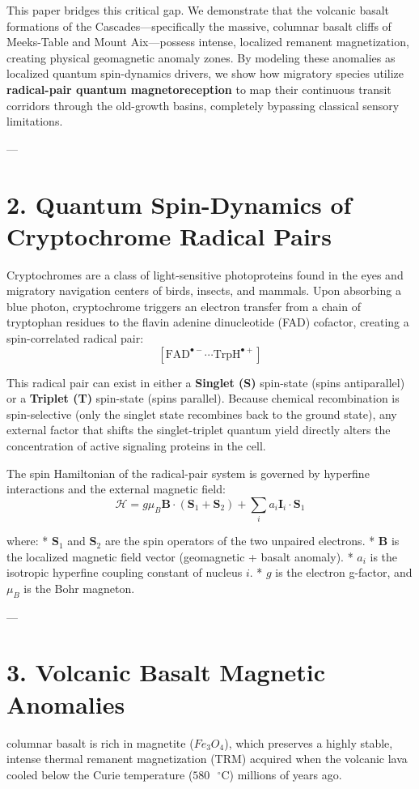 \documentclass[11pt,twocolumn]{article}
\begin{document}
This paper bridges this critical gap. We demonstrate that the volcanic basalt formations of the Cascades—specifically the massive, columnar basalt cliffs of Meeks-Table and Mount Aix—possess intense, localized remanent magnetization, creating physical geomagnetic anomaly zones. By modeling these anomalies as localized quantum spin-dynamics drivers, we show how migratory species utilize \textbf{radical-pair quantum magnetoreception} to map their continuous transit corridors through the old-growth basins, completely bypassing classical sensory limitations.

---

\section{2. Quantum Spin-Dynamics of Cryptochrome Radical Pairs}
Cryptochromes are a class of light-sensitive photoproteins found in the eyes and migratory navigation centers of birds, insects, and mammals. Upon absorbing a blue photon, cryptochrome triggers an electron transfer from a chain of tryptophan residues to the flavin adenine dinucleotide (FAD) cofactor, creating a spin-correlated radical pair:
$$[\text{FAD}^{\bullet -} \cdots \text{TrpH}^{\bullet +}]$$

This radical pair can exist in either a \textbf{Singlet (S)} spin-state (spins antiparallel) or a \textbf{Triplet (T)} spin-state (spins parallel). Because chemical recombination is spin-selective (only the singlet state recombines back to the ground state), any external factor that shifts the singlet-triplet quantum yield directly alters the concentration of active signaling proteins in the cell.

The spin Hamiltonian of the radical-pair system is governed by hyperfine interactions and the external magnetic field:
$$\mathcal{H} = g \mu_B \mathbf{B} \cdot \left(\mathbf{S}_1 + \mathbf{S}_2\right) + \sum_{i} a_i \mathbf{I}_i \cdot \mathbf{S}_1$$

where:
*   $\mathbf{S}_1$ and $\mathbf{S}_2$ are the spin operators of the two unpaired electrons.
*   $\mathbf{B}$ is the localized magnetic field vector (geomagnetic + basalt anomaly).
*   $a_i$ is the isotropic hyperfine coupling constant of nucleus $i$.
*   $g$ is the electron g-factor, and $\mu_B$ is the Bohr magneton.

---

\section{3. Volcanic Basalt Magnetic Anomalies}
columnar basalt is rich in magnetite ($Fe_3O_4$), which preserves a highly stable, intense thermal remanent magnetization (TRM) acquired when the volcanic lava cooled below the Curie temperature ($580\text{ }^\circ\text{C}$) millions of years ago. 
\end{document}
